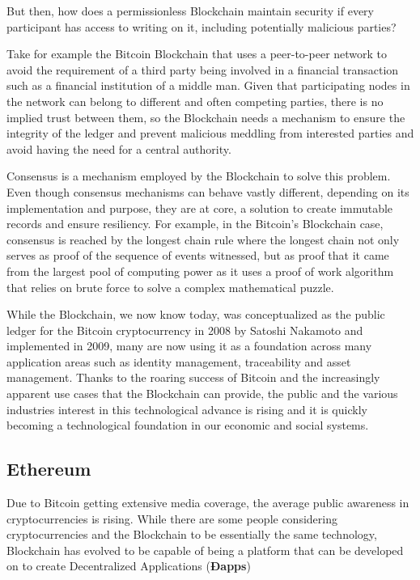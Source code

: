   But then, how does a permissionless Blockchain maintain security if every
  participant has access to writing on it, including potentially malicious
  parties?

  Take for example the Bitcoin Blockchain that uses a peer-to-peer network to
  avoid the requirement of a third party being involved in a financial
  transaction such as a financial institution of a middle man. Given that
  participating nodes in the network can belong to different and often
  competing parties, there is no implied trust between them, so the Blockchain
  needs a mechanism to ensure the integrity of the ledger and prevent malicious
  meddling from interested parties and avoid having the need for a central
  authority.\cite{Barclay2017}

  Consensus is a mechanism employed by the Blockchain to solve this problem.
  Even though consensus mechanisms can behave vastly different, depending on
  its implementation and purpose, they are at core, a solution to create
  immutable records and ensure resiliency.  For example, in the Bitcoin's
  Blockchain case, consensus is reached by the longest chain rule where the
  longest chain not only serves as proof of the sequence of events witnessed,
  but as proof that it came from the largest pool of computing power as it uses
  a proof of work algorithm that relies on brute force to solve a complex
  mathematical puzzle.\cite{Baars2016}

  While the Blockchain, we now know today, was conceptualized as the public
  ledger for the Bitcoin cryptocurrency in 2008 by Satoshi Nakamoto and
  implemented in 2009, many are now using it as a foundation across many
  application areas such as identity management, traceability and asset
  management.  Thanks to the roaring success of Bitcoin and the increasingly
  apparent use cases that the Blockchain can provide, the public and the
  various industries interest in this technological advance is rising and it is
  quickly becoming a technological foundation in our economic and social
  systems.

  \subsection{Ethereum}

  Due to Bitcoin getting extensive media coverage, the average public awareness
  in cryptocurrencies is rising.  While there are some people considering
  cryptocurrencies and the Blockchain to be essentially the same technology,
  Blockchain has evolved to be capable of being a platform that can be
  developed on to create Decentralized Applications (\textbf{Ðapps})


